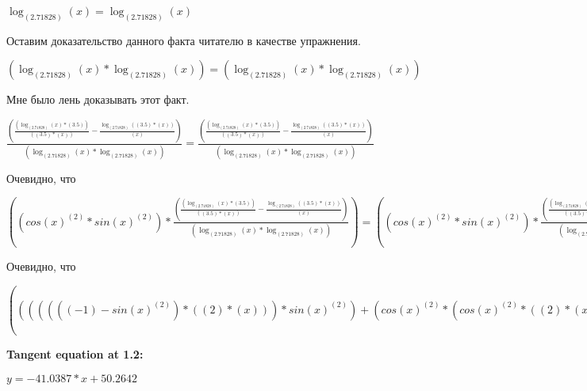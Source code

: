\documentclass[12pt,a4paper,fleqn]{article}
\theoremstyle{definition}
\begin{document}
$\log_{( 2.71828 )}{( x )} = \log_{( 2.71828 )}{( x )}$

Оставим доказательство данного факта читателю в качестве упражнения.

$(\log_{( 2.71828 )}{( x )} * \log_{( 2.71828 )}{( x )}) = (\log_{( 2.71828 )}{( x )} * \log_{( 2.71828 )}{( x )})$

Мне было лень доказывать этот факт.

$\frac{(\frac{(\log_{( 2.71828 )}{( x )} * ( 3.5 ))}{(( 3.5 ) * ( x ))}
 - \frac{\log_{( 2.71828 )}{(( 3.5 ) * ( x ))}}{( x )}
)}{(\log_{( 2.71828 )}{( x )} * \log_{( 2.71828 )}{( x )})}
 = \frac{(\frac{(\log_{( 2.71828 )}{( x )} * ( 3.5 ))}{(( 3.5 ) * ( x ))}
 - \frac{\log_{( 2.71828 )}{(( 3.5 ) * ( x ))}}{( x )}
)}{(\log_{( 2.71828 )}{( x )} * \log_{( 2.71828 )}{( x )})}
$

Очевидно, что

$((cos{( x )}^{( 2 )} * sin{( x )}^{( 2 )}) * \frac{(\frac{(\log_{( 2.71828 )}{( x )} * ( 3.5 ))}{(( 3.5 ) * ( x ))}
 - \frac{\log_{( 2.71828 )}{(( 3.5 ) * ( x ))}}{( x )}
)}{(\log_{( 2.71828 )}{( x )} * \log_{( 2.71828 )}{( x )})}
) = ((cos{( x )}^{( 2 )} * sin{( x )}^{( 2 )}) * \frac{(\frac{(\log_{( 2.71828 )}{( x )} * ( 3.5 ))}{(( 3.5 ) * ( x ))}
 - \frac{\log_{( 2.71828 )}{(( 3.5 ) * ( x ))}}{( x )}
)}{(\log_{( 2.71828 )}{( x )} * \log_{( 2.71828 )}{( x )})}
)$

Очевидно, что

$((((((( -1 ) - sin{( x )}^{( 2 )}) * (( 2 ) * ( x ))) * sin{( x )}^{( 2 )}) + (cos{( x )}^{( 2 )} * (cos{( x )}^{( 2 )} * (( 2 ) * ( x ))))) * \log_{( x )}{(( 3.5 ) * ( x ))}) + ((cos{( x )}^{( 2 )} * sin{( x )}^{( 2 )}) * \frac{(\frac{(\log_{( 2.71828 )}{( x )} * ( 3.5 ))}{(( 3.5 ) * ( x ))}
 - \frac{\log_{( 2.71828 )}{(( 3.5 ) * ( x ))}}{( x )}
)}{(\log_{( 2.71828 )}{( x )} * \log_{( 2.71828 )}{( x )})}
)) = ((((((( -1 ) - sin{( x )}^{( 2 )}) * (( 2 ) * ( x ))) * sin{( x )}^{( 2 )}) + (cos{( x )}^{( 2 )} * (cos{( x )}^{( 2 )} * (( 2 ) * ( x ))))) * \log_{( x )}{(( 3.5 ) * ( x ))}) + ((cos{( x )}^{( 2 )} * sin{( x )}^{( 2 )}) * \frac{(\frac{(\log_{( 2.71828 )}{( x )} * ( 3.5 ))}{(( 3.5 ) * ( x ))}
 - \frac{\log_{( 2.71828 )}{(( 3.5 ) * ( x ))}}{( x )}
)}{(\log_{( 2.71828 )}{( x )} * \log_{( 2.71828 )}{( x )})}
))$


\textbf{Tangent equation at 1.2:}

$y = -41.0387 * x + 50.2642$
\end{document}

